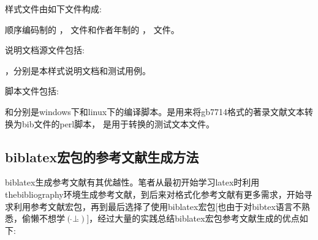 样式文件由如下文件构成:

顺序编码制的 ， 文件和作者年制的
， 文件。

说明文档源文件包括:

，分别是本样式说明文档和测试用例。

脚本文件包括:

和分别是windows下和linux下的编译脚本。是用来将gb7714格式的著录文献文本转换为bib文件的perl脚本，
是用于转换的测试文本文件。

\subsection{biblatex宏包的参考文献生成方法}
biblatex生成参考文献有其优越性。笔者从最初开始学习latex时利用thebibliography环境生成参考文献，到后来对格式化参考文献有更多需求，开始寻求利用参考文献宏包，再到最后选择了使用biblatex宏包[也由于对bibtex语言不熟悉，偷懒不想学$( \hat{} \bot \hat{} )$]，经过大量的实践总结biblatex宏包参考文献生成的优点如下:

